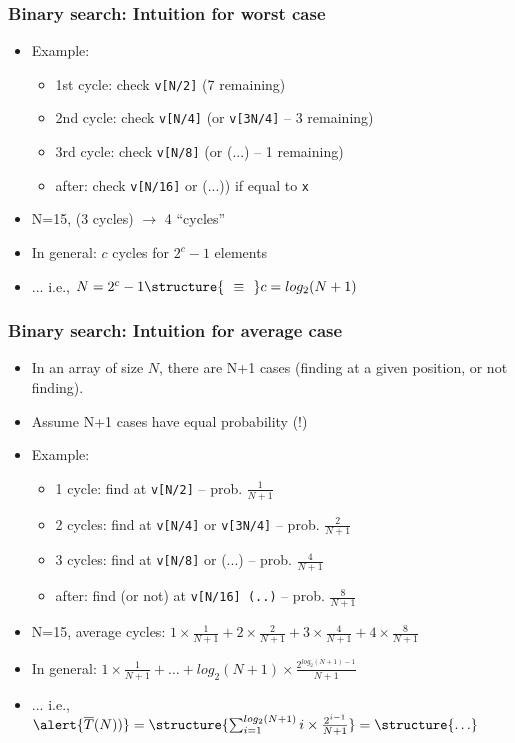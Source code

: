 \documentclass[aspectratio=169]{beamer}
\begin{document}
\begin{frame}\frametitle{Binary search: Intuition for worst case}    
  \begin{itemize}
    \item Example: 
    \begin{itemize}
      \item \alert{1st cycle:} check \texttt{v[N/2]} (7 remaining)
      \item \alert{2nd cycle:} check \texttt{v[N/4]} (or \texttt{v[3N/4]} -- 3 remaining)
      \item \alert{3rd cycle:} check \texttt{v[N/8]} (or (...) -- 1 remaining)
      \item \alert{after:} check \texttt{v[N/16]} or (...)) if equal to \texttt{x}
    \end{itemize}
    \item N=15, (3 cycles) $\to$ 4 ``cycles''
    \item In general: $c$ cycles for $2^c-1$ elements
    \item ... i.e., $N = 2^{c}-1 \structure{~~\equiv~~} c = log_2(N+1)$
  \end{itemize}
\end{frame}


\begin{frame}\frametitle{Binary search: Intuition for average case}
  \begin{itemize}
    \item In an array of size $N$, there are N+1 cases (finding at a given position, or not finding).
    \item Assume N+1 cases have equal probability (!)
    \item Example: 
    \begin{itemize}
      \item \alert{1 cycle:} find at \texttt{v[N/2]}  -- prob. $\frac{1}{N+1}$
      \item \alert{2 cycles:} find at \texttt{v[N/4]} or \texttt{v[3N/4]} -- prob. $\frac{2}{N+1}$
      \item \alert{3 cycles:} find at \texttt{v[N/8]} or (...) -- prob. $\frac{4}{N+1}$
      \item \alert{after:} find (or not) at \texttt{v[N/16] (..)} -- prob. $\frac{8}{N+1}$
    \end{itemize}
    \item N=15, average cycles: $1\times\frac{1}{N+1} + 2\times\frac{2}{N+1} + 3\times\frac{4}{N+1} + 
            4\times\frac{8}{N+1}$
    \item In general: $1\times\frac{1}{N+1} + \ldots + log_2(N+1)\times\frac{2^{log_2(N+1)-1}}{N+1}$
    \item ... i.e.,
      $\alert{\overline T(N))}
      = \structure{\sum_{i=1}^{log_2(N+1)} i\times \frac{2^{i-1}}{N+1}}
      = \structure{\ldots}$
  \end{itemize}
\end{frame}
\end{document}
